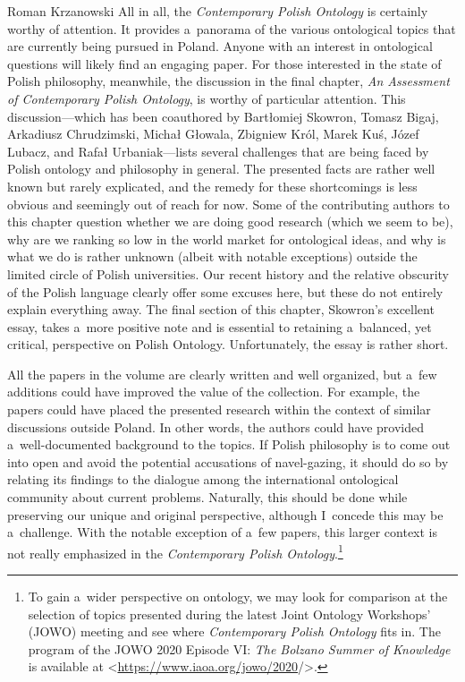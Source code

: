 \begin{recengenv}{Roman Krzanowski}
\enlargethispage{-.5\baselineskip}
All in all, the \textit{Contemporary Polish Ontology} is certainly worthy of attention. It provides a~panorama of the various ontological topics that are currently being pursued in Poland. Anyone with an interest in ontological questions will likely find an engaging paper. For those interested in the state of Polish philosophy, meanwhile, the discussion in the final chapter, \textit{An Assessment of Contemporary Polish Ontology}, is worthy of particular attention. This discussion—which has been coauthored by Bartłomiej Skowron, Tomasz Bigaj, Arkadiusz Chrudzimski, Michał Głowala, Zbigniew Król, Marek Kuś, Józef Lubacz, and Rafał Urbaniak—lists several challenges that are being faced by Polish ontology and philosophy in general. The presented facts are rather well known but rarely explicated, and the remedy for these shortcomings is less obvious and seemingly out of reach for now. Some of the contributing authors to this chapter question whether we are doing good research (which we seem to be), why are we ranking so low in the world market for ontological ideas, and why is what we do is rather unknown (albeit with notable exceptions) outside the limited circle of Polish universities. Our recent history and the relative obscurity of the Polish language clearly offer some excuses here, but these do not entirely explain everything away. The final section of this chapter, Skowron's excellent essay, takes a~more positive note and is essential to retaining a~balanced, yet critical, perspective on Polish Ontology. Unfortunately, the essay is rather short.

All the papers in the volume are clearly written and well organized, but a~few additions could have improved the value of the collection. For example, the papers could have placed the presented research within the context of similar discussions outside Poland. In other words, the authors could have provided a~well-documented background to the topics. If Polish philosophy is to come out into open and avoid the potential accusations of navel-gazing, it should do so by relating its findings to the dialogue among the international ontological community about current problems. Naturally, this should be done while preserving our unique and original perspective, although I~concede this may be a~challenge. With the notable exception of a~few papers, this larger context is not really emphasized in the \textit{Contemporary Polish Ontology}.\footnote{To gain a~wider perspective on ontology, we may look for comparison at the selection of topics presented during the latest Joint Ontology Workshops' (JOWO) meeting and see where \textit{Contemporary Polish Ontology} fits in. The program of the JOWO 2020 Episode VI: \textit{The Bolzano Summer of Knowledge} is available at {\textless}\url{https://www.iaoa.org/jowo/2020}/{\textgreater}.}


\end{recengenv}
